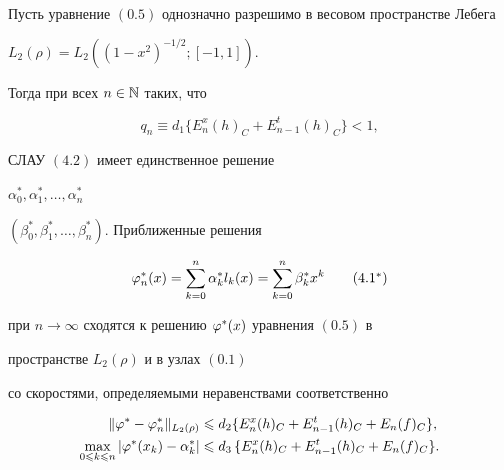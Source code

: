 \begin{thm}


Пусть уравнение $(0.5)$ однозначно разрешимо в весовом пространстве Лебега


$L_2(\rho)=L_2((1-x^2)^{-1/2};[-1,1])$.


Тогда при всех $n\in \Bbb{N}$ таких, что


\begin{equation}


q_n\equiv d_1 \{ E_n^x(h)_C+E_{n-1}^t(h)_C\}<1,


\end{equation}


СЛАУ $(4.2)$ имеет единственное решение


$\alpha_0^*,\alpha_1^*,\dotsc,\alpha_n^*$


$(\beta_0^*, \beta_1^*, \dots, \beta_n^*)$. Приближенные решения


\begin{equation}


\vp_n^*(x)=\sum_{k=0}^n\alpha_k^* l_k(x)=\sum_{k=0}^n\beta_k^*x^k


\tag{4.1${}^*$}


\end{equation}


при $n\to \infty$ сходятся к решению $\varphi^*(x)$ уравнения $(0.5)$ в 


пространстве $L_2(\rho)$ и в узлах $(0.1)$


со скоростями, определяемыми неравенствами соответственно


\begin{align}


\|\vp^*-\vp_n^*\|_{L_2(\rho)}&\lea d_2 \{ E_n^x(h)_C+E_{n-1}^t(h)_C+E_n(f)_C\},\\


%


\max_{0\lea k\lea n}|\vp^*(x_k)-\al_k^*|&\lea d_3\, \{ E_n^x(h)_C+E_{n-1}^t(h)_C+


E_n(f)_C\}.


\end{align}


\end{thm}





\setcounter{cor}{0}





